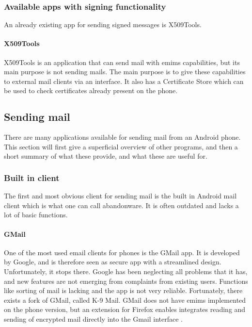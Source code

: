 \subsubsection{Available apps with signing functionality}
An already existing app for sending signed messages is X509Tools.

\paragraph{X509Tools} \hfill
\newline
X509Tools is an application that can send mail with \gls{emims} capabilities, but its main purpose is not sending mails. The main purpose is to give these capabilities to external mail clients via an interface. It also has a Certificate Store which can be used to check certificates already present on the phone. 

\subsection{Sending mail}
There are many applications available for sending mail from an Android phone. This section will first give a superficial overview of other programs, and then a short summary of what these provide, and what these are useful for.

\subsubsection{Built in client}
The first and most obvious client for sending mail is the built in Android mail client which is what one can call abandonware. It is often outdated and lacks a lot of basic functions.

\paragraph{GMail} \hfill
\newline
One of the most used email clients for phones is the GMail app. It is developed by Google, and is therefore seen as secure app with a streamlined design. Unfortunately, it stops there. Google has been neglecting all problems that it has, and new features are not emerging from complaints from existing users. Functions like sorting of mail is lacking and the app is not very reliable. Fortunately, there exists a fork of GMail, called K-9 Mail. GMail does not have \gls{emims} implemented on the phone version, but an extension for Firefox enables integrates reading and sending of encrypted mail directly into the Gmail interface \cite{bib:gmail}.

